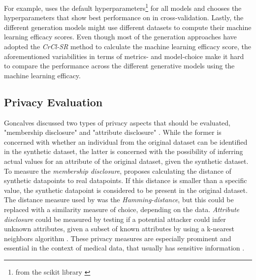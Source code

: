 For example, \cite{kunar2021DTGANDifferentialPrivatea} uses the default hyperparameters\footnote{from the scikit library \cite{scikit-learn}} for all models and 
\cite{kim2021OCTGANNeuralODEbased} chooses the hyperparameters that show best performance on in cross-validation.
Lastly, the different generation models might use different datasets to compute their machine learning efficacy scores.
Even though most of the generation approaches have adopted the \textit{CrCl-SR}\cite{goncalves2020GenerationEvaluationSynthetic} method to calculate the machine learning efficacy score,
the aforementioned variabilities in terms of metrics- and model-choice make it hard to compare the performance across the different generative models using the machine learning efficacy.

\subsection{Privacy Evaluation}
\label{ch:preliminaries-evaluationOfSyntheticTabularData-privacyEvaluation}
Goncalves \etal discussed two types of privacy aspects that should be evaluated, "membership disclosure" and "attribute disclosure" \cite[p. 7f.]{goncalves2020GenerationEvaluationSynthetic}.
While the former is concerned with whether an individual from the original dataset can be identified in the synthetic dataset, the latter is concerned with the possibility of inferring actual values for an attribute of the original dataset, given the synthetic dataset.
To measure the \textit{membership disclosure}, \cite{goncalves2020GenerationEvaluationSynthetic} proposes calculating the distance of synthetic datapoints to real datapoints.
If this distance is smaller than a specific value, the synthetic datapoint is considered to be present in the original dataset.
The distance measure used by \cite{goncalves2020GenerationEvaluationSynthetic} was the \textit{Hamming-distance}, but this could be replaced with a similarity measure of choice, depending on the data.
\textit{Attribute disclosure} could be measured by testing if a potential attacker could infer unknown attributes, given a subset of known attributes by using a k-nearest neighbors algorithm \cite{goncalves2020GenerationEvaluationSynthetic}.
These privacy measures are especially prominent and essential in the context of medical data, that usually has sensitive information \cite{goncalves2020GenerationEvaluationSynthetic, choi2017GeneratingMultilabelDiscrete}.

